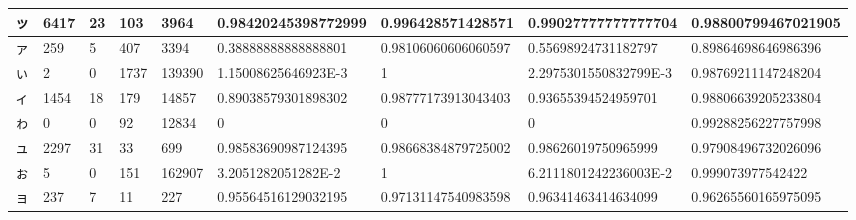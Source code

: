 \begin{table}[H]
\begin{center}
\begin{CJK}{UTF8}{min}
\begin{tabular}{ | l | l | l | l | l | l | l | l | l | }
			ッ & 6417 & 23 & 103 & 3964 & 0.98420245398772999 & 0.996428571428571 & 0.99027777777777704 & 0.98800799467021905 \\ \hline
			ァ & 259 & 5 & 407 & 3394 & 0.38888888888888801 & 0.98106060606060597 & 0.55698924731182797 & 0.89864698646986396 \\ \hline
			ぃ & 2 & 0 & 1737 & 139390 & 1.15008625646923E-3 & 1 & 2.2975301550832799E-3 & 0.98769211147248204 \\ \hline
			ィ & 1454 & 18 & 179 & 14857 & 0.89038579301898302 & 0.98777173913043403 & 0.93655394524959701 & 0.98806639205233804 \\ \hline
			ゎ & 0 & 0 & 92 & 12834 & 0 & 0 & 0 & 0.99288256227757998 \\ \hline
			ュ & 2297 & 31 & 33 & 699 & 0.98583690987124395 & 0.98668384879725002 & 0.98626019750965999 & 0.97908496732026096 \\ \hline
			ぉ & 5 & 0 & 151 & 162907 & 3.2051282051282E-2 & 1 & 6.2111801242236003E-2 & 0.999073977542422 \\ \hline
				ョ & 237 & 7 & 11 & 227 & 0.95564516129032195 & 0.97131147540983598 & 0.96341463414634099 & 0.96265560165975095 \\ \hline
		\end{tabular}
		\end{CJK}
		
	\end{center}
\end{table}
